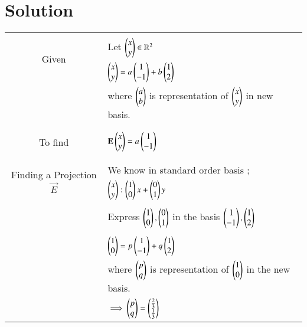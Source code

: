 \documentclass[journal,12pt]{IEEEtran}
\begin{document}
\section{\textbf{Solution}}
\renewcommand{\thetable}{1}
\begin{longtable}{|c|l|}
\hline
\multirow{3}{*}{Given} 
    	& \\
     	&  Let $\begin{pmatrix}x\\y\end{pmatrix} \in \mathbb{R}^{2}$\\
     	& $\begin{pmatrix}x\\y\end{pmatrix} = a\begin{pmatrix}1\\-1\end{pmatrix} +b\begin{pmatrix}1\\2\end{pmatrix}$\\
     	& where $\begin{pmatrix}a\\b\end{pmatrix}$ is representation of $\begin{pmatrix}x\\y\end{pmatrix}$ in new basis.\\
     	&\\
\hline
\multirow{3}{*}{To find} 
     	&\\
        &$\mathbf{E}\begin{pmatrix}x\\y\end{pmatrix} = a\begin{pmatrix}1\\-1\end{pmatrix}$\\
     	&\\
\hline
\multirow{3}{*}{Finding a Projection $\vec{E}$} & \\
       & We know in standard order basis ;\\
       & $\begin{pmatrix}x\\y\end{pmatrix} : \begin{pmatrix}1\\0\end{pmatrix}x + \begin{pmatrix}0\\1\end{pmatrix}y$\\
       &\\
       & Express $\begin{pmatrix}1\\0\end{pmatrix},\begin{pmatrix}0\\1\end{pmatrix}$ in the basis       $\begin{pmatrix}1\\-1\end{pmatrix},\begin{pmatrix}1\\2\end{pmatrix}$\\
      &\\
      & $\begin{pmatrix}1\\0\end{pmatrix} = p\begin{pmatrix}1\\-1\end{pmatrix} + q\begin{pmatrix}1\\2\end{pmatrix}$\\
      & where $\begin{pmatrix}p\\q\end{pmatrix}$ is representation of $\begin{pmatrix}1\\0\end{pmatrix}$ in  the new basis.\\
      & $\implies \begin{pmatrix}p\\q\end{pmatrix}=\begin{pmatrix}\frac{2}{3}\\\frac{1}{3}\end{pmatrix}$\\

\end{longtable}
\end{document}
